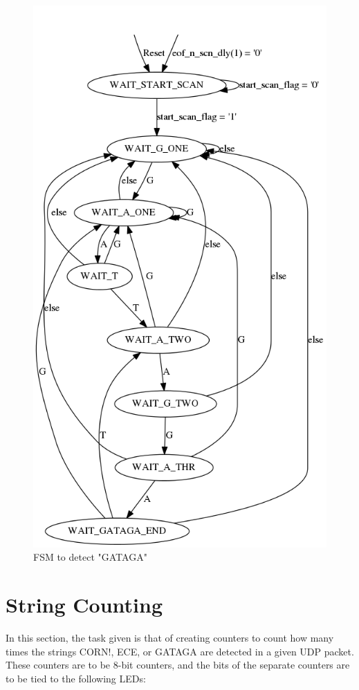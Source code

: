 \documentclass{article}
\begin{document}
	\begin{figure}[H]
		\begin{center}
			\includegraphics[scale=0.3]{../graphviz/part_3_state_diagram_GATAGA.png}
			\caption{FSM to detect "GATAGA"}
		\end{center}
	\end{figure}

\section{String Counting}
In this section, the task given is that of creating counters to count how many times the strings CORN!, ECE, or GATAGA are detected in a given UDP packet. These counters are to be 8-bit counters, and the bits of the separate counters are to be tied to the following LEDs:\\
\end{document}
